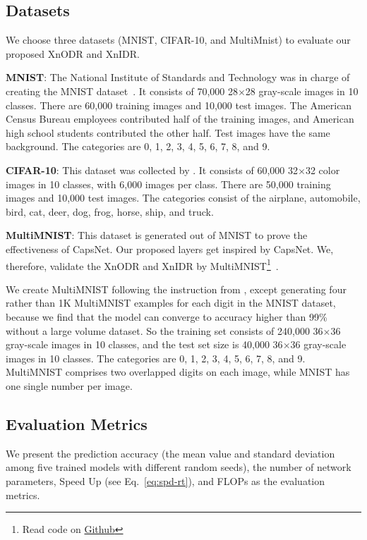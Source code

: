 \documentclass[sn-mathphys,iicol,Numbered]{sn-jnl}
\begin{document}
\subsection{Datasets}

We choose three datasets (MNIST, CIFAR-10, and MultiMnist) to evaluate our proposed XnODR and XnIDR. 

\textbf{MNIST}: The National Institute of Standards and Technology was in charge of creating the MNIST dataset~\cite{A50_mnst}. It consists of 70,000 28$\times$28 gray-scale images in 10 classes. There are 60,000 training images and 10,000 test images. The American Census Bureau employees contributed half of the training images, and American high school students contributed the other half. Test images have the same background. The categories are 0, 1, 2, 3, 4, 5, 6, 7, 8, and 9.  

\textbf{CIFAR-10}: This dataset was collected by \cite{A49_cfr10}. It consists of 60,000 32$\times$32 color images in 10 classes, with 6,000 images per class. There are 50,000 training images and 10,000 test images. The categories consist of the airplane, automobile, bird, cat, deer, dog, frog, horse, ship, and truck.

\textbf{MultiMNIST}: This dataset is generated out of MNIST to prove the effectiveness of CapsNet. Our proposed layers get inspired by CapsNet. We, therefore, validate the XnODR and XnIDR by MultiMNIST\footnote{Read code on \hyperlink{https://github.com/jiansfoggy/CODE-SHOW/blob/master/Python/Multi\_Mnist/fast\_generate\_multimnist.py}{Github}}~\citep{A1_caps}.

We create MultiMNIST following the instruction from \cite{A1_caps}, except generating four rather than 1K MultiMNIST examples for each digit in the MNIST dataset, because we find that the model can converge to accuracy higher than 99\% without a large volume dataset. So the training set consists of 240,000 36$\times$36 gray-scale images in 10 classes, and the test set size is 40,000 36$\times$36 gray-scale images in 10 classes. The categories are 0, 1, 2, 3, 4, 5, 6, 7, 8, and 9. MultiMNIST comprises two overlapped digits on each image, while MNIST has one single number per image.

\subsection{Evaluation Metrics} \label{sec:4.2}

We present the prediction accuracy (the mean value and standard deviation among five trained models with different random seeds), the number of network parameters, Speed Up (see Eq.~\ref{eq:spd-rt}), and FLOPs as the evaluation metrics.
\end{document}
